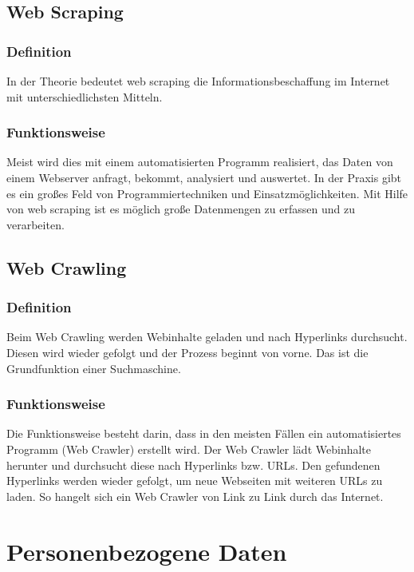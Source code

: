 	\subsection{Web Scraping}
		\subsubsection{Definition}
		In der Theorie bedeutet web scraping die Informationsbeschaffung im Internet mit unterschiedlichsten Mitteln. \cite{WebScraping}
		\subsubsection{Funktionsweise}
		Meist wird dies mit einem automatisierten Programm realisiert, das Daten von einem Webserver anfragt, bekommt, analysiert und auswertet. 
		In der Praxis gibt es ein großes Feld von Programmiertechniken und Einsatzmöglichkeiten.
		Mit Hilfe von web scraping ist es möglich große Datenmengen zu erfassen und zu verarbeiten.\cite{WebScraping}

	\subsection{Web Crawling}
		\subsubsection{Definition}
		Beim Web Crawling werden Webinhalte geladen und nach Hyperlinks durchsucht. Diesen wird wieder gefolgt und der Prozess beginnt von vorne. Das ist die Grundfunktion einer Suchmaschine.\cite{WebScraping}
		\subsubsection{Funktionsweise}
		Die Funktionsweise besteht darin, dass in den meisten Fällen ein automatisiertes Programm (Web Crawler) erstellt wird. Der Web Crawler lädt Webinhalte herunter und durchsucht diese nach Hyperlinks bzw. URLs. Den gefundenen Hyperlinks werden wieder gefolgt, um neue Webseiten mit weiteren URLs zu laden. So hangelt sich ein Web Crawler von Link zu Link durch das Internet.\cite{WebScraping}

\section{Personenbezogene Daten}
